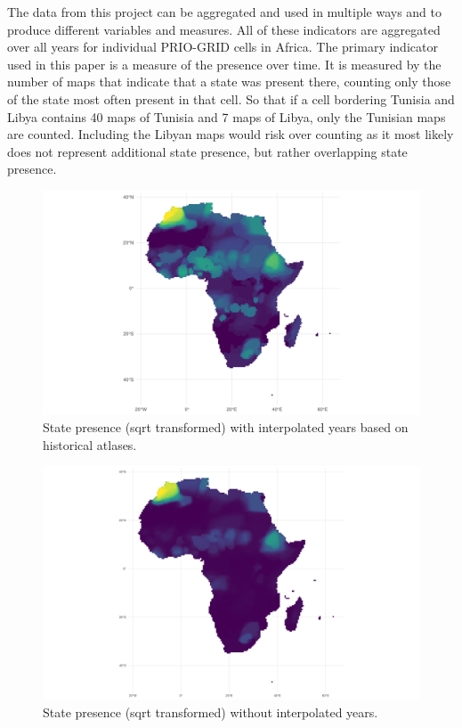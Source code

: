 \documentclass[12pt]{article}
\begin{document}

The data from this project can be aggregated and used in multiple ways and to
produce different variables and measures. All of these indicators are aggregated
over all years for individual PRIO-GRID cells in Africa. The primary indicator
used in this paper is a measure of the presence over time. It is measured by the
number of maps that indicate that a state was present there, counting only those
of the state most often present in that cell. So that if a cell bordering
Tunisia and Libya contains 40 maps of Tunisia and 7 maps of Libya, only the
Tunisian maps are counted. Including the Libyan maps would risk over counting as
it most likely does not represent additional state presence, but rather
overlapping state presence. 


\begin{figure}[htpb]
	\centering
	\includegraphics[width=\linewidth]{../R/Output/sqrtSpAll.pdf}
	\caption{State presence (sqrt transformed) with interpolated years based
	on historical atlases.}
	\label{Sp_i}
\end{figure}

\begin{figure}[htpb]
	\centering
	\includegraphics[width=\linewidth]{../R/Output/sp_os_sum.pdf}
	\caption{State presence (sqrt transformed) without interpolated years.}
	\label{Sp}
\end{figure}
\end{document}
